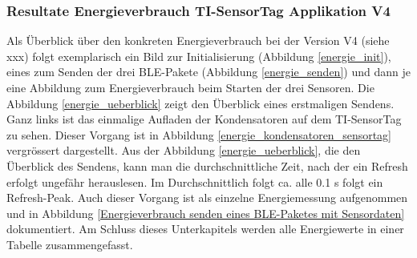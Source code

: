 \subsubsection{Resultate Energieverbrauch TI-SensorTag Applikation V4}
\label{energie_sensortag} 

Als Überblick über den konkreten Energieverbrauch bei der Version V4 (siehe  xxx) folgt exemplarisch ein Bild zur Initialisierung (Abbildung \ref{energie_init}), eines zum Senden der drei BLE-Pakete (Abbildung \ref{energie_senden}) und dann je eine Abbildung zum Energieverbrauch beim Starten der drei Sensoren. Die Abbildung \ref{energie_ueberblick} zeigt den Überblick eines erstmaligen Sendens. Ganz links ist das einmalige Aufladen der Kondensatoren auf dem TI-SensorTag zu sehen. Dieser Vorgang ist in Abbildung \ref{energie_kondensatoren_sensortag} vergrössert dargestellt. Aus der Abbildung \ref{energie_ueberblick}, die den Überblick des Sendens, kann man die durchschnittliche Zeit, nach der ein Refresh erfolgt ungefähr herauslesen. Im Durchschnittlich folgt ca. alle 0.1 s folgt ein Refresh-Peak. Auch dieser Vorgang ist als einzelne Energiemessung aufgenommen und in Abbildung \ref{Energieverbrauch senden eines BLE-Paketes mit Sensordaten} dokumentiert. Am Schluss dieses Unterkapitels werden alle Energiewerte in einer Tabelle zusammengefasst.

\clearpage

